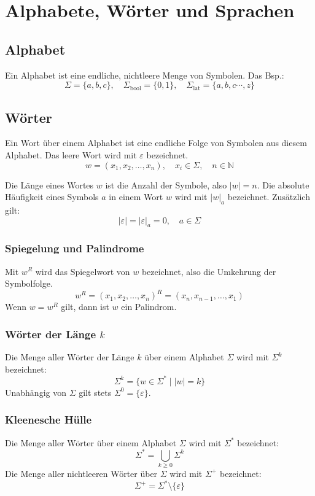\section*{Alphabete, Wörter und Sprachen}

\subsection{Alphabet}
Ein Alphabet ist eine endliche, nichtleere Menge von Symbolen. Das  Bsp.:
\[
    \Sigma = \{a,b,c\}, \quad
    \Sigma_\text{bool} = \{0,1\}, \quad
    \Sigma_\text{lat} = \{a,b,c \cdots ,z\}
\]

\subsection{Wörter}
Ein Wort über einem Alphabet ist eine endliche Folge von Symbolen aus diesem Alphabet. Das leere Wort wird mit $\varepsilon$ bezeichnet.
\[
    w = (x_1, x_2, \dots, x_n), \quad x_i \in \Sigma, \quad n \in \mathbb{N}
\]

Die Länge eines Wortes $w$ ist die Anzahl der Symbole, also $|w| = n$. Die absolute Häufigkeit eines Symbols $a$ in einem Wort $w$ wird mit $|w|_a$ bezeichnet. Zusätzlich gilt:
\[
    |\varepsilon| = |\varepsilon|_a = 0, \quad a \in \Sigma
\]

\subsubsection{Spiegelung und Palindrome}
Mit \(w^R\) wird das Spiegelwort von \(w\) bezeichnet, also die Umkehrung der Symbolfolge.
\[
    w^R = (x_1, x_2, \dots, x_n)^R = (x_n, x_{n-1}, \dots, x_1)
\]
Wenn \(w=w^R\) gilt, dann ist \(w\) ein Palindrom.

\subsubsection{\texorpdfstring{Wörter der Länge \(k\)}{Wörter der Länge k}}
Die Menge aller Wörter der Länge \(k\) über einem Alphabet \(\Sigma\) wird mit \(\Sigma^k\) bezeichnet:
\[
    \Sigma^k = \{ w \in \Sigma^* \mid |w| = k \}
\]
Unabhängig von \(\Sigma\) gilt stets \(\Sigma^0 = \{\varepsilon\}\).

\subsubsection{Kleenesche Hülle}
Die Menge aller Wörter über einem Alphabet \(\Sigma\) wird mit \(\Sigma^*\) bezeichnet:
\[
    \Sigma^* = \bigcup_{k \ge 0} \Sigma^k
\]
Die Menge aller nichtleeren Wörter über \(\Sigma\) wird mit \(\Sigma^+\) bezeichnet:
\[
    \Sigma^+ = \Sigma^* \setminus \{\varepsilon\}
\]

